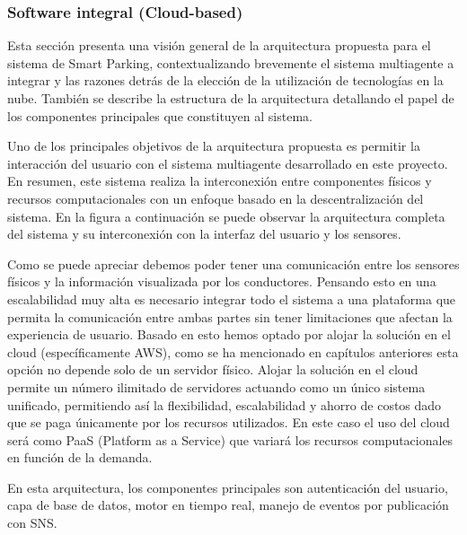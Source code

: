 \clearpage

\subsubsection{Software integral (Cloud-based)}
Esta sección presenta una visión general de la arquitectura propuesta para el sistema de Smart Parking, contextualizando brevemente el sistema multiagente a integrar y las razones detrás de la elección de la utilización de tecnologías en la nube. También se describe la estructura de la arquitectura detallando el papel de los componentes principales que constituyen al sistema.


Uno de los principales objetivos de la arquitectura propuesta es permitir la interacción del usuario con el sistema multiagente desarrollado en este proyecto. En resumen, este sistema realiza la interconexión entre componentes físicos y recursos computacionales con un enfoque basado en la descentralización del sistema. En la figura a continuación se puede observar la arquitectura completa del sistema y su interconexión con la interfaz del usuario y los sensores.


Como se puede apreciar debemos poder tener una comunicación entre los sensores físicos y la información visualizada por los conductores. Pensando esto en una escalabilidad muy alta es necesario integrar todo el sistema a una plataforma que permita la comunicación entre ambas partes sin tener limitaciones que afectan la experiencia de usuario. Basado en esto hemos optado por alojar la solución en el cloud (específicamente AWS), como se ha mencionado en capítulos anteriores esta opción no depende solo de un servidor físico. Alojar la solución en el cloud permite un número ilimitado de servidores actuando como un único sistema unificado, permitiendo así la flexibilidad, escalabilidad y ahorro de costos dado que se paga únicamente por los recursos utilizados. En este caso el uso del cloud será como PaaS (Platform as a Service) que variará los recursos computacionales en función de la demanda.

En esta arquitectura, los componentes principales son autenticación del usuario, capa de base de datos, motor en tiempo real, manejo de eventos por publicación con SNS.

